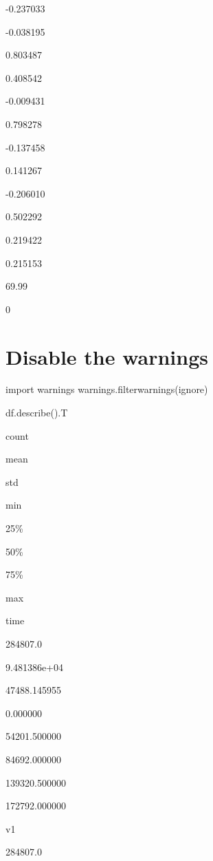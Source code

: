 \documentclass[
]{article}
\newenvironment{Shaded}{\begin{snugshade}}{\end{snugshade}}
\newcommand{\ImportTok}[1]{#1}
\newcommand{\NormalTok}[1]{#1}
\newcommand{\StringTok}[1]{\textcolor[rgb]{0.31,0.60,0.02}{#1}}
\begin{document}
-0.237033

-0.038195

0.803487

0.408542

-0.009431

0.798278

-0.137458

0.141267

-0.206010

0.502292

0.219422

0.215153

69.99

0

\hypertarget{disable-the-warnings}{%
\section{Disable the warnings}\label{disable-the-warnings}}

\begin{Shaded}
\begin{Highlighting}[]
\ImportTok{import}\NormalTok{ warnings}
\NormalTok{warnings.filterwarnings(}\StringTok{\textquotesingle{}ignore\textquotesingle{}}\NormalTok{)}
\end{Highlighting}
\end{Shaded}

\begin{Shaded}
\begin{Highlighting}[]
\NormalTok{df.describe().T}
\end{Highlighting}
\end{Shaded}

count

mean

std

min

25\%

50\%

75\%

max

time

284807.0

9.481386e+04

47488.145955

0.000000

54201.500000

84692.000000

139320.500000

172792.000000

v1

284807.0
\end{document}
